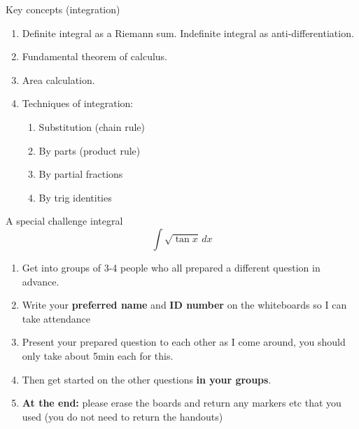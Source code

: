 \documentclass{beamer}
\begin{document}
\begin{frame}{Key concepts (integration)}
\begin{enumerate}
  \item Definite integral as a Riemann sum. Indefinite integral as anti-differentiation.
  \item Fundamental theorem of calculus.
  \item Area calculation.
  \item Techniques of integration:
    \begin{enumerate}
      \item Substitution (chain rule)
      \item By parts (product rule)
      \item By partial fractions
      \item By trig identities
    \end{enumerate}
\end{enumerate}
  \begin{block}{A special challenge integral}
    \begin{displaymath}
      \int \sqrt{\tan x} \, dx
    \end{displaymath}
  \end{block}
\end{frame}




\begin{frame}{\inserttitle}
\begin{enumerate}
  \item Get into groups of 3-4 people who all prepared a different question in advance.
  \item Write your \textbf{preferred name} and \textbf{ID number} on the whiteboards so I can take attendance
  \item Present your prepared question to each other as I come around, you should only take about 5min each for this.
  \item Then get started on the other questions \textbf{in your groups}.
  \item \textbf{At the end:} please erase the boards and return any markers etc that you used (you do not need to return the handouts)
\end{enumerate}
\end{frame}
\end{document}
